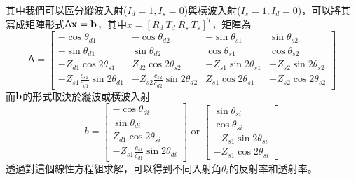 \documentclass[12pt]{report}
\begin{document}
其中我們可以區分縱波入射($I_d=1, I_s=0$)與橫波入射($I_s=1, I_d=0$)，可以將其寫成矩陣形式$\mathsf{A} \boldsymbol{\mathbf{x}}=\boldsymbol{\mathbf{b}}$，其中$x=[R_d\ T_d\ R_s\ T_s]^T$，矩陣為
\begin{equation}
    \mathsf{A}=\left[\begin{array}{cccc}
        -\cos \theta_{d 1} & -\cos \theta_{d 2} & -\sin \theta_{s 1} & \sin \theta_{s 2} \\
        -\sin \theta_{d 1} & \sin \theta_{d 2} & \cos \theta_{s 1} & \cos \theta_{s 2} \\
        -Z_{d 1} \cos 2 \theta_{s 1} & Z_{d 2} \cos 2 \theta_{s 2} & -Z_{s 1} \sin 2 \theta_{s 1} & -Z_{s 2} \sin 2 \theta_{s 2} \\
        -Z_{s 1} \frac{c_{s 1}}{c_{d 1}} \sin 2 \theta_{d 1} & -Z_{s 2} \frac{c_{s 2}}{c_{d 2}} \sin 2 \theta_{d 2} & Z_{s 1} \cos 2 \theta_{s 1} & -Z_{s 2} \cos 2 \theta_{s 2}
        \end{array}\right]
\end{equation}
而$\boldsymbol{\mathbf{b}}$的形式取決於縱波或橫波入射
\begin{equation}
    b=\left[\begin{matrix}-\cos\theta_{di}\\\sin\theta_{di}\\Z_{d1}\cos 2\theta_{si}\\-Z_{s1}\frac{c_{s1}}{c_{d1}}\sin 2\theta_{di}\end{matrix}\right] \text{ or }
        \left[\begin{matrix}\sin\theta_{si}\\\cos\theta_{si}\\-Z_{s1}\sin 2\theta_{si}\\-Z_{s1}\cos 2\theta_{si}\end{matrix}\right] 
\end{equation}
透過對這個線性方程組求解，可以得到不同入射角$\theta_i$的反射率和透射率。
\end{document}
